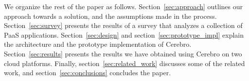 We organize the rest of the paper as follows. Section~\ref{sec:approach} outlines our approach towards
a solution, and the assumptions made in the process. Section~\ref{sec:survey}
presents the results of a survey that analyzes a collection of PaaS applications. Section~\ref{sec:design}
and section~\ref{sec:prototype_impl} explain the architecture and the prototype implementation of Cerebro.
Section~\ref{sec:results} presents the results we have obtained using Cerebro on two cloud platforms.
Finally, section~\ref{sec:related_work} discusses some of the related work, and section~\ref{sec:conclusions}
concludes the paper.